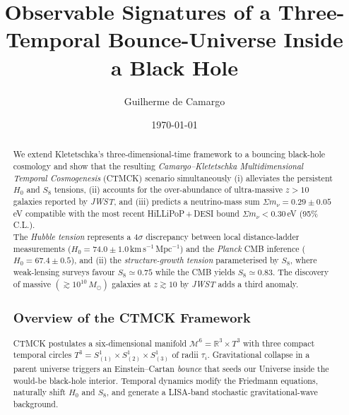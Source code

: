 \documentclass[reprint,amsmath,amssymb,aps,prd,nofootinbib,longbibliography]{revtex4-2}
\begin{document}
\title{Observable Signatures of a Three-Temporal Bounce-Universe Inside a Black Hole}
\author{Guilherme de Camargo}
\date{\today}

\begin{abstract}
We extend Kletetschka's three-dimensional-time framework to a bouncing black-hole cosmology and show that the resulting \textit{Camargo–Kletetschka Multidimensional Temporal Cosmogenesis} (CTMCK) scenario simultaneously (i) alleviates the persistent $H_0$ and $S_8$ tensions, (ii) accounts for the over-abundance of ultra-massive $z>10$ galaxies reported by \textit{JWST}, and (iii) predicts a neutrino-mass sum $\Sigma m_\nu = 0.29\pm0.05\,$eV compatible with the most recent HiLLiPoP\,+\,DESI bound $\Sigma m_\nu<0.30\,$eV (95\% C.L.). \\[2pt]
The \textit{Hubble tension} represents a $4\sigma$ discrepancy between local distance-ladder measurements ($H_0 = 74.0\pm1.0\,$km\,s$^{-1}$\,Mpc$^{-1}$) and the \textit{Planck} CMB inference ($H_0 = 67.4\pm0.5$), and  
(ii) the \textit{structure-growth tension} parameterised by $S_8$, where weak-lensing surveys favour $S_8\simeq0.75$ while the CMB yields $S_8\simeq0.83$.  
The discovery of massive $(\gtrsim10^{10}\,M_\odot)$ galaxies at $z\gtrsim10$ by \textit{JWST} adds a third anomaly.

\subsection{Overview of the CTMCK Framework}
CTMCK postulates a six-dimensional manifold $\mathcal{M}^6=\mathbb{R}^3\!\times\!T^3$ with three compact temporal circles $T^3=S^1_{(1)}\times S^1_{(2)}\times S^1_{(3)}$ of radii $\tau_i$. Gravitational collapse in a parent universe triggers an Einstein–Cartan \emph{bounce} that seeds our Universe inside the would-be black-hole interior. Temporal dynamics modify the Friedmann equations, naturally shift $H_0$ and $S_8$, and generate a LISA-band stochastic gravitational-wave background.
\end{abstract}

\maketitle
\end{document}
